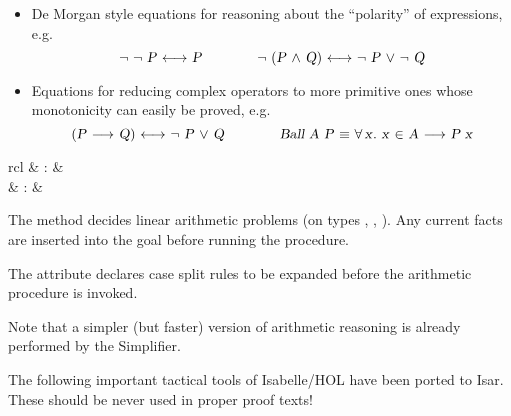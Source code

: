 \begin{isabellebody}
\begin{isamarkuptext}
\begin{itemize}
  \item De Morgan style equations for reasoning about the ``polarity''
  of expressions, e.g.
  \[
  \isa{{\isachardoublequote}{\isasymnot}\ {\isasymnot}\ P\ {\isasymlongleftrightarrow}\ P{\isachardoublequote}} \qquad\qquad
  \isa{{\isachardoublequote}{\isasymnot}\ {\isacharparenleft}P\ {\isasymand}\ Q{\isacharparenright}\ {\isasymlongleftrightarrow}\ {\isasymnot}\ P\ {\isasymor}\ {\isasymnot}\ Q{\isachardoublequote}}
  \]

  \item Equations for reducing complex operators to more primitive
  ones whose monotonicity can easily be proved, e.g.
  \[
  \isa{{\isachardoublequote}{\isacharparenleft}P\ {\isasymlongrightarrow}\ Q{\isacharparenright}\ {\isasymlongleftrightarrow}\ {\isasymnot}\ P\ {\isasymor}\ Q{\isachardoublequote}} \qquad\qquad
  \isa{{\isachardoublequote}Ball\ A\ P\ {\isasymequiv}\ {\isasymforall}x{\isachardot}\ x\ {\isasymin}\ A\ {\isasymlongrightarrow}\ P\ x{\isachardoublequote}}
  \]

  \end{itemize}

\end{isamarkuptext}%
\isamarkuptrue%
%
\isamarkuptrue%
%
\begin{isamarkuptext}%
\begin{matharray}{rcl}
    \hypertarget{method.HOL.arith}{\hyperlink{method.HOL.arith}{\mbox{}}} & : & \isarmeth \\
    \hypertarget{attribute.HOL.arith-split}{\hyperlink{attribute.HOL.arith-split}{\mbox{}}} & : & \isaratt \\
  \end{matharray}

  The \hyperlink{method.HOL.arith}{\mbox{}} method decides linear arithmetic problems
  (on types , , ).  Any current
  facts are inserted into the goal before running the procedure.

  The \hyperlink{attribute.HOL.arith-split}{\mbox{}} attribute declares case split
  rules to be expanded before the arithmetic procedure is invoked.

  Note that a simpler (but faster) version of arithmetic reasoning is
  already performed by the Simplifier.%
\end{isamarkuptext}%
\isamarkuptrue%
%
\isamarkuptrue%
%
\begin{isamarkuptext}%
The following important tactical tools of Isabelle/HOL have been
  ported to Isar.  These should be never used in proper proof texts!


\end{isamarkuptext}
\end{isabellebody}
